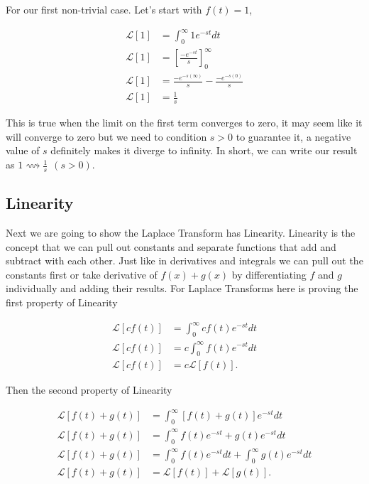 \documentclass[12pt]{article}
\newcommand{\lp}{\mathscr{L}}
\newcommand{\lrsa}{\longrightsquigarrow}
\begin{document}
For our first non-trivial case. Let's start with $f(t)=1$,

\begin{align*}
    \lp[1]&=\int_0^{\infty} 1 e^{-st} dt \\
    \lp[1]&=\left[\frac{-e^{-st}}{s}\right]_0^{\infty} \\
    \lp[1]&=\frac{-e^{-s(\infty)}}{s}-\frac{-e^{-s(0)}}{s} \\
    \lp[1]&=\frac{1}{s}
\end{align*}

This is true when the limit on the first term converges to zero, it may seem like it will converge to zero but we need to condition $s>0$ to guarantee it, a negative value of $s$ definitely makes it diverge to infinity. In short, we can write our result as $1 \lrsa \frac{1}{s} \hspace{5pt} (s>0)$. \\

\subsection{Linearity}

Next we are going to show the Laplace Transform has Linearity. Linearity is the concept that we can pull out constants and separate functions that add and subtract with each other. Just like in derivatives and integrals we can pull out the constants first or take derivative of $f(x)+g(x)$ by differentiating $f$ and $g$ individually and adding their results. For Laplace Transforms here is proving the first property of Linearity

\begin{align*}
    \lp[cf(t)]&=\int_0^{\infty} cf(t) e^{-st} dt \\
    \lp[cf(t)]&=c\int_0^{\infty} f(t) e^{-st} dt \\
    \lp[cf(t)]&=c\lp[f(t)].
\end{align*}

Then the second property of Linearity

\begin{align*}
    \lp[f(t)+g(t)]&=\int_0^{\infty} [f(t)+g(t)] e^{-st} dt \\
    \lp[f(t)+g(t)]&=\int_0^{\infty} f(t)e^{-st}+g(t)e^{-st} dt \\
    \lp[f(t)+g(t)]&=\int_0^{\infty} f(t)e^{-st}dt +\int_0^{\infty}g(t)e^{-st} dt \\
    \lp[f(t)+g(t)]&=\lp[f(t)]+\lp[g(t)].
\end{align*}
\end{document}
